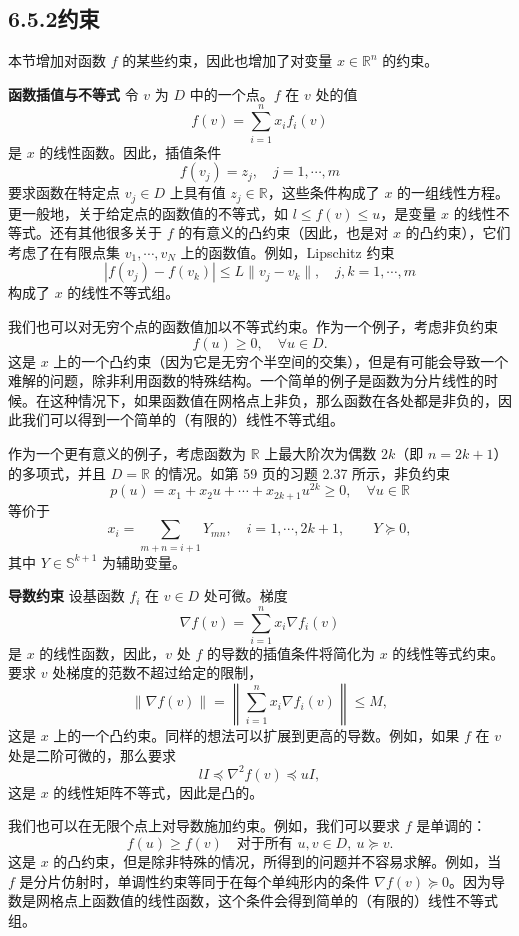 \documentclass[UTF8,12pt,a4paper,fontset=fandol]{ctexart}
\begin{document}
\subsection*{6.5.2\quad 约束}

本节增加对函数 $f$ 的某些约束，因此也增加了对变量 $x\in\mathbb{R}^n$ 的约束。

\noindent\textbf{函数插值与不等式}\quad
令 $v$ 为 $D$ 中的一个点。$f$ 在 $v$ 处的值
\[
f(v)=\sum_{i=1}^n x_if_i(v)
\]
是 $x$ 的线性函数。因此，插值条件
\[
f(v_j)=z_j,\quad j=1,\cdots,m
\]
要求函数在特定点 $v_j\in D$ 上具有值 $z_j\in\mathbb{R}$，这些条件构成了 $x$ 的一组线性方程。更一般地，关于给定点的函数值的不等式，如 $l\leq f(v)\leq u$，是变量 $x$ 的线性不等式。还有其他很多关于 $f$ 的有意义的凸约束（因此，也是对 $x$ 的凸约束），它们考虑了在有限点集 $v_1,\cdots,v_N$ 上的函数值。例如，Lipschitz 约束
\[
|f(v_j)-f(v_k)|\leq L\|v_j-v_k\|,\quad j,k=1,\cdots,m
\]
构成了 $x$ 的线性不等式组。

我们也可以对无穷个点的函数值加以不等式约束。作为一个例子，考虑非负约束
\[
f(u)\geq 0,\quad \forall u\in D.
\]
这是 $x$ 上的一个凸约束（因为它是无穷个半空间的交集），但是有可能会导致一个难解的问题，除非利用函数的特殊结构。一个简单的例子是函数为分片线性的时候。在这种情况下，如果函数值在网格点上非负，那么函数在各处都是非负的，因此我们可以得到一个简单的（有限的）线性不等式组。

作为一个更有意义的例子，考虑函数为 $\mathbb{R}$ 上最大阶次为偶数 $2k$（即 $n=2k+1$）的多项式，并且 $D=\mathbb{R}$ 的情况。如第 59 页的习题 2.37 所示，非负约束
\[
p(u)=x_1+x_2u+\cdots+x_{2k+1}u^{2k}\geq 0,\quad \forall u\in\mathbb{R}
\]
等价于
\[
x_i=\sum_{m+n=i+1}Y_{mn},\quad i=1,\cdots,2k+1,\qquad Y\succeq 0,
\]
其中 $Y\in\mathbb{S}^{k+1}$ 为辅助变量。

\noindent\textbf{导数约束}\quad
设基函数 $f_i$ 在 $v\in D$ 处可微。梯度
\[
\nabla f(v)=\sum_{i=1}^n x_i\nabla f_i(v)
\]
是 $x$ 的线性函数，因此，$v$ 处 $f$ 的导数的插值条件将简化为 $x$ 的线性等式约束。要求 $v$ 处梯度的范数不超过给定的限制，
\[
\|\nabla f(v)\|=\left\|\sum_{i=1}^n x_i\nabla f_i(v)\right\|\leq M,
\]
这是 $x$ 上的一个凸约束。同样的想法可以扩展到更高的导数。例如，如果 $f$ 在 $v$ 处是二阶可微的，那么要求
\[
lI\preceq \nabla^2 f(v)\preceq uI,
\]
这是 $x$ 的线性矩阵不等式，因此是凸的。

我们也可以在无限个点上对导数施加约束。例如，我们可以要求 $f$ 是单调的：
\[
f(u)\geq f(v) \quad \text{对于所有 } u,v\in D,\ u\succeq v.
\]
这是 $x$ 的凸约束，但是除非特殊的情况，所得到的问题并不容易求解。例如，当 $f$ 是分片仿射时，单调性约束等同于在每个单纯形内的条件 $\nabla f(v)\succeq 0$。因为导数是网格点上函数值的线性函数，这个条件会得到简单的（有限的）线性不等式组。
\end{document}
